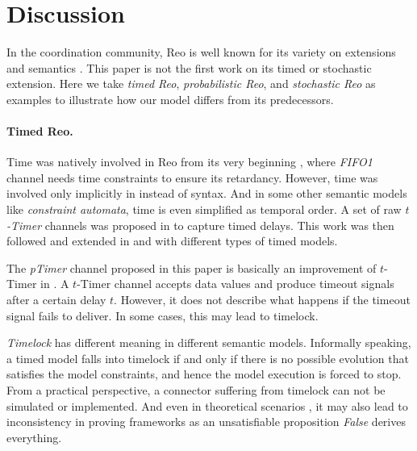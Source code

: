 \section{Discussion}
\label{sec:discussion}

In the coordination community, Reo is well known for its variety on extensions and semantics \cite{Jongmans2012}. This paper is not the first work on its timed or stochastic 
extension. Here we take \emph{timed Reo}, \emph{probabilistic Reo}, and \emph{stochastic Reo} 
as examples to illustrate how our model differs from its predecessors.

\paragraph{Timed Reo.}
Time was natively involved in Reo from its very beginning \cite{ARBAB2004}, where \emph{FIFO1} channel needs time constraints to ensure its retardancy. However, time was involved only implicitly in  \cite{ARBAB2004} instead of syntax. And in some other semantic models like \emph{constraint automata}, time is even simplified as temporal order. A set of raw \emph{$t$-Timer} channels was proposed in \cite{Arbab2006} to capture timed delays. This work was then followed and extended in \cite{Meng2007} and \cite{Meng2012} with different types of timed models.

The \emph{pTimer} channel proposed in this paper is basically an improvement of {$t$-Timer} in \cite{Meng2012}. A {$t$-Timer} channel accepts data values and produce timeout signals after a certain delay $t$. However, it does not describe what happens if the timeout signal fails to deliver. In some cases, this may lead to timelock.

\emph{Timelock} has different meaning in different semantic models. Informally speaking, a timed model falls into timelock if and only if there is no possible evolution that satisfies the model constraints, and hence the model execution is forced to stop. From a practical perspective, a connector suffering from timelock can not be simulated or implemented. And even in theoretical scenarios \cite{Li2015}, it may also lead to inconsistency in proving frameworks as an unsatisfiable proposition \emph{False} derives everything.

